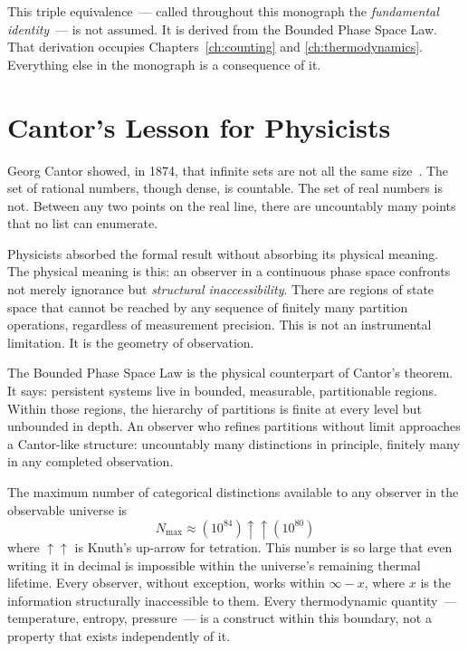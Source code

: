 This triple equivalence~--- called throughout this monograph the
\emph{fundamental identity}~--- is not assumed. It is derived from the
Bounded Phase Space Law. That derivation occupies Chapters~\ref{ch:counting}
and \ref{ch:thermodynamics}. Everything else in the monograph is a consequence of it.


\section*{Cantor's Lesson for Physicists}

Georg Cantor showed, in 1874, that infinite sets are not all the same
size~\cite{cantor1874,cantor1891}. The set of rational numbers, though dense, is
countable. The set of real numbers is not. Between any two points on the real line,
there are uncountably many points that no list can enumerate.

Physicists absorbed the formal result without absorbing its physical meaning.
The physical meaning is this: an observer in a continuous phase space confronts
not merely ignorance but \emph{structural inaccessibility}. There are regions of
state space that cannot be reached by any sequence of finitely many partition
operations, regardless of measurement precision. This is not an instrumental
limitation. It is the geometry of observation.

The Bounded Phase Space Law is the physical counterpart of Cantor's theorem.
It says: persistent systems live in bounded, measurable, partitionable regions.
Within those regions, the hierarchy of partitions is finite at every level but
unbounded in depth. An observer who refines partitions without limit approaches
a Cantor-like structure: uncountably many distinctions in principle, finitely many
in any completed observation.

The maximum number of categorical distinctions available to any observer in the
observable universe is
\[
  N_{\max} \approx (10^{84})\uparrow\uparrow(10^{80})
\]
where $\uparrow\uparrow$ is Knuth's up-arrow for tetration. This number is so large
that even writing it in decimal is impossible within the universe's remaining
thermal lifetime. Every observer, without exception, works within $\infty - x$,
where $x$ is the information structurally inaccessible to them. Every thermodynamic
quantity~--- temperature, entropy, pressure~--- is a construct within this boundary,
not a property that exists independently of it.


